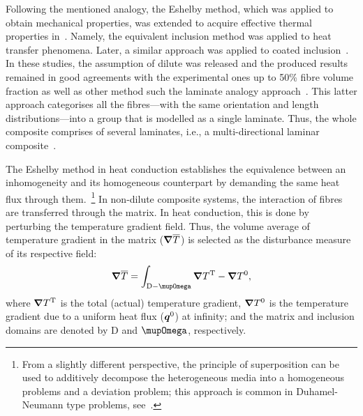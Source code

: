 	Following the mentioned analogy, the Eshelby method, which was applied to obtain mechanical properties, was extended to acquire effective thermal properties in~\autocite{Hatta.1985}. Namely, the equivalent inclusion method was applied to heat transfer phenomena. Later, a similar approach was applied to coated inclusion~\autocite{Hatta.1986,Taya.1989}. In these studies, the assumption of dilute was released and the produced results remained in good agreements with the experimental ones up to 50\% fibre volume fraction as well as other method such the laminate analogy approach~\autocite{Fu.2003}. This latter approach categorises all the fibres---with the same orientation and length distributions---into a group that is modelled as a single laminate. Thus, the whole composite comprises of several laminates, i.e., a multi-directional laminar composite~\autocite{Callister.2018}. 	
	
	The Eshelby method in heat conduction establishes the equivalence between an inhomogeneity and its homogeneous counterpart by demanding the same heat flux through them.~\footnote{From a slightly different perspective, the principle of superposition can be used to additively decompose the heterogeneous media into a homogeneous problems and a deviation problem; this approach is common in Duhamel-Neumann type problems, see~\autocite{Javanbakht.2019b,Ghosh.2011,Oliver.2017}.} In non-dilute composite systems, the interaction of fibres are transferred through the matrix. In heat conduction, this is done by perturbing the temperature gradient field. Thus, the volume average of temperature gradient in the matrix ($\grad{\overline{T}}$) is selected as the disturbance measure of its respective field:
	\begin{equation}
		\grad{\overline{T}}=\int_{\text{D}-\mupOmega} \grad{T}^\text{T}-\grad{T}^0,
	\end{equation}
	where $\grad{T}^\text{T}$ is the total (actual) temperature gradient, $\grad{T}^0$ is the temperature gradient due to a uniform heat flux ($\tena{q}^0$) at infinity; and the matrix and inclusion domains are denoted by $\text{D}$ and $\mupOmega$, respectively.
	
